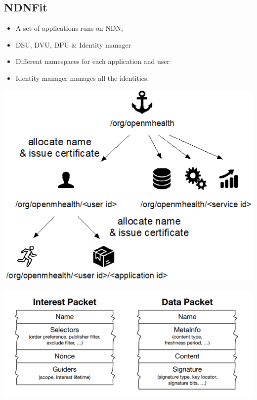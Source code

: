 \documentclass[a0,portrait]{poster}
\begin{document}
\begin{multicols}{2}
\begin{minipage}[b]{0.3\linewidth}
\subsection*{NDNFit\cite{zhang2018ndnfit}}
\par
	\begin{itemize}
		\item A set of applications runs on NDN;
		\item DSU, DVU, DPU \& Identity manager
		\item Different namespaces for each application and user
		\item Identity manager manages all the identities.
	\end{itemize}
\par
\end{minipage}
\begin{minipage}[b]{0.65\linewidth}
	\includegraphics[width=\linewidth]{figures/NDNfit.png}
\end{minipage}


\includegraphics[width=\linewidth]{figures/packet.png}


\end{multicols}
\end{document}
